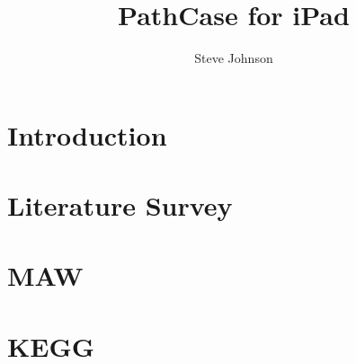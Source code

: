 \documentclass[12pt]{report}
\title{PathCase for iPad}
\author{Steve Johnson}
\begin{document}



\tableofcontents


\listoffigures


\pagebreak

\pagebreak

\chapter{Introduction}
\label{ch:introduction}


\chapter{Literature Survey}
\label{ch:literature_survey}


\chapter{MAW}
\label{ch:maw_smda}


\chapter{KEGG}
\label{ch:kegg}


\nocite{*}


\end{document}
